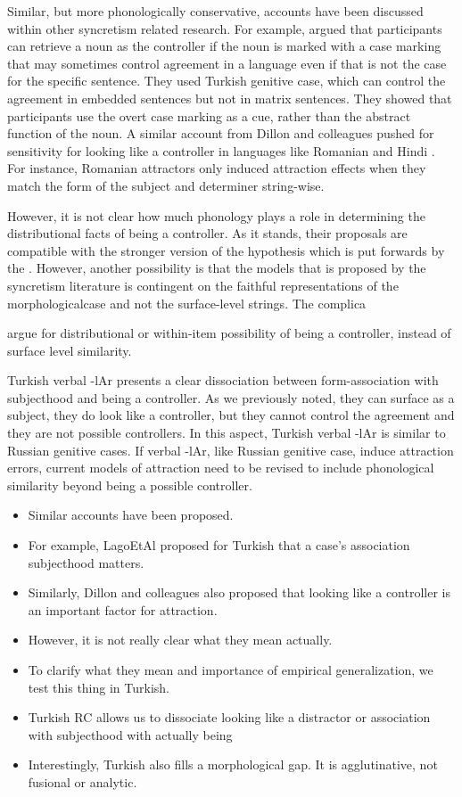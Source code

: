 \documentclass[
  authoryear,
  3p]{elsarticle}
\providecommand{\tightlist}{%
  \setlength{\itemsep}{0pt}\setlength{\parskip}{0pt}}
\begin{document}
Similar, but more phonologically conservative, accounts have been
discussed within other syncretism related research. For example,
\citet{LagoEtAl2019} argued that participants can retrieve a noun as the
controller if the noun is marked with a case marking that may sometimes
control agreement in a language even if that is not the case for the
specific sentence. They used Turkish genitive case, which can control
the agreement in embedded sentences but not in matrix sentences. They
showed that participants use the overt case marking as a cue, rather
than the abstract function of the noun. A similar account from Dillon
and colleagues pushed for sensitivity for looking like a controller in
languages like Romanian and Hindi
\citep{BhatiaDillon2022, BleotuDillon2024}. For instance, Romanian
attractors only induced attraction effects when they match the form of
the subject and determiner string-wise.

However, it is not clear how much phonology plays a role in determining
the distributional facts of being a controller. As it stands, their
proposals are compatible with the stronger version of the hypothesis
which is put forwards by the \citet{Slioussar2018}. However, another
possibility is that the models that is proposed by the syncretism
literature is contingent on the faithful representations of the
morphologicalcase and not the surface-level strings. The complica

argue for distributional or within-item possibility of being a
controller, instead of surface level similarity.

Turkish verbal -lAr presents a clear dissociation between
form-association with subjecthood and being a controller. As we
previously noted, they can surface as a subject, they do look like a
controller, but they cannot control the agreement and they are not
possible controllers. In this aspect, Turkish verbal -lAr is similar to
Russian genitive cases. If verbal -lAr, like Russian genitive case,
induce attraction errors, current models of attraction need to be
revised to include phonological similarity beyond being a possible
controller.

\begin{itemize}
\tightlist
\item
  Similar accounts have been proposed.
\item
  For example, LagoEtAl proposed for Turkish that a case's association
  subjecthood matters.
\item
  Similarly, Dillon and colleagues also proposed that looking like a
  controller is an important factor for attraction.
\item
  However, it is not really clear what they mean actually.
\item
  To clarify what they mean and importance of empirical generalization,
  we test this thing in Turkish.
\item
  Turkish RC allows us to dissociate looking like a distractor or
  association with subjecthood with actually being
\item
  Interestingly, Turkish also fills a morphological gap. It is
  agglutinative, not fusional or analytic.
\end{itemize}
\end{document}
